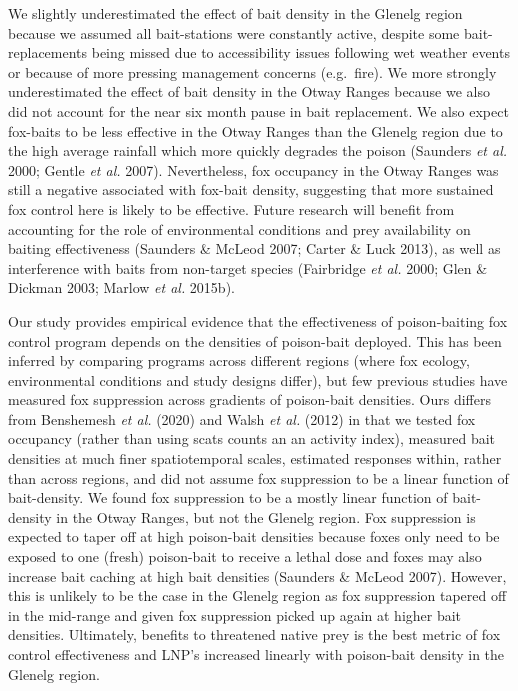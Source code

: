 \documentclass[11pt,a4paper,titlepage,twoside,openright]{style/unimelbthesis}
\begin{document}
\begin{mainmatter}
We slightly underestimated the effect of bait density in the Glenelg region because we assumed all bait-stations were constantly active, despite some bait-replacements being missed due to accessibility issues following wet weather events or because of more pressing management concerns (e.g.~fire). We more strongly underestimated the effect of bait density in the Otway Ranges because we also did not account for the near six month pause in bait replacement. We also expect fox-baits to be less effective in the Otway Ranges than the Glenelg region due to the high average rainfall which more quickly degrades the poison (Saunders \emph{et al.} 2000; Gentle \emph{et al.} 2007). Nevertheless, fox occupancy in the Otway Ranges was still a negative associated with fox-bait density, suggesting that more sustained fox control here is likely to be effective. Future research will benefit from accounting for the role of environmental conditions and prey availability on baiting effectiveness (Saunders \& McLeod 2007; Carter \& Luck 2013), as well as interference with baits from non-target species (Fairbridge \emph{et al.} 2000; Glen \& Dickman 2003; Marlow \emph{et al.} 2015b).

Our study provides empirical evidence that the effectiveness of poison-baiting fox control program depends on the densities of poison-bait deployed. This has been inferred by comparing programs across different regions (where fox ecology, environmental conditions and study designs differ), but few previous studies have measured fox suppression across gradients of poison-bait densities. Ours differs from Benshemesh \emph{et al.} (2020) and Walsh \emph{et al.} (2012) in that we tested fox occupancy (rather than using scats counts an an activity index), measured bait densities at much finer spatiotemporal scales, estimated responses within, rather than across regions, and did not assume fox suppression to be a linear function of bait-density. We found fox suppression to be a mostly linear function of bait-density in the Otway Ranges, but not the Glenelg region. Fox suppression is expected to taper off at high poison-bait densities because foxes only need to be exposed to one (fresh) poison-bait to receive a lethal dose and foxes may also increase bait caching at high bait densities (Saunders \& McLeod 2007). However, this is unlikely to be the case in the Glenelg region as fox suppression tapered off in the mid-range and given fox suppression picked up again at higher bait densities. Ultimately, benefits to threatened native prey is the best metric of fox control effectiveness and LNP's increased linearly with poison-bait density in the Glenelg region.


\end{mainmatter}
\end{document}
